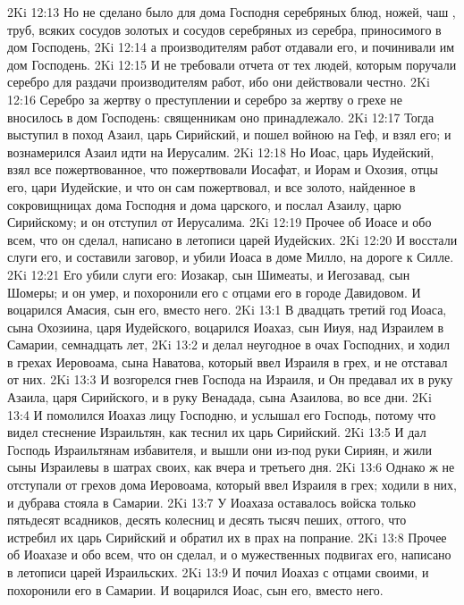 \vs 2Ki 12:13 Но не сделано было для дома Господня серебряных блюд, ножей, чаш , труб, всяких сосудов золотых и сосудов серебряных из серебра, приносимого в дом Господень,
\vs 2Ki 12:14 а производителям работ отдавали его, и починивали им дом Господень.
\vs 2Ki 12:15 И не требовали отчета от тех людей, которым поручали серебро для раздачи производителям работ, ибо они действовали честно.
\vs 2Ki 12:16 Серебро за жертву о преступлении и серебро за жертву о грехе не вносилось в дом Господень: священникам оно принадлежало.
\rsbpar\vs 2Ki 12:17 Тогда выступил в поход Азаил, царь Сирийский, и пошел войною на Геф, и взял его; и вознамерился Азаил идти на Иерусалим.
\vs 2Ki 12:18 Но Иоас, царь Иудейский, взял все пожертвованное, что пожертвовали  Иосафат, и Иорам и Охозия, отцы его, цари Иудейские, и что он сам пожертвовал, и все золото, найденное в сокровищницах дома Господня и дома царского, и послал Азаилу, царю Сирийскому; и он отступил от Иерусалима.
\rsbpar\vs 2Ki 12:19 Прочее об Иоасе и обо всем, что он сделал, написано в летописи царей Иудейских.
\rsbpar\vs 2Ki 12:20 И восстали слуги его, и составили заговор, и убили Иоаса в доме Милло, на дороге к Силле.
\vs 2Ki 12:21 Его убили слуги его: Иозакар, сын Шимеаты, и Иегозавад, сын Шомеры; и он умер, и похоронили его с отцами его в городе Давидовом. И воцарился Амасия, сын его, вместо него.
\vs 2Ki 13:1 В двадцать третий год Иоаса, сына Охозиина, царя Иудейского, воцарился Иоахаз, сын Ииуя, над Израилем в Самарии,  семнадцать лет,
\vs 2Ki 13:2 и делал неугодное в очах Господних, и ходил в грехах Иеровоама, сына Наватова, который ввел Израиля в грех, и не отставал от них.
\vs 2Ki 13:3 И возгорелся гнев Господа на Израиля, и Он предавал их в руку Азаила, царя Сирийского, и в руку Венадада, сына Азаилова, во все дни.
\vs 2Ki 13:4 И помолился Иоахаз лицу Господню, и услышал его Господь, потому что видел стеснение Израильтян, как теснил их царь Сирийский.
\vs 2Ki 13:5 И дал Господь Израильтянам избавителя, и вышли они из-под руки Сириян, и жили сыны Израилевы в шатрах своих, как вчера и третьего дня.
\vs 2Ki 13:6 Однако ж не отступали от грехов дома Иеровоама, который ввел Израиля в грех; ходили в них, и дубрава стояла в Самарии.
\vs 2Ki 13:7 У Иоахаза оставалось войска только пятьдесят всадников, десять колесниц и десять тысяч пеших, оттого, что истребил их царь Сирийский и обратил их в прах на попрание.
\rsbpar\vs 2Ki 13:8 Прочее об Иоахазе и обо всем, что он сделал, и о мужественных подвигах его, написано в летописи царей Израильских.
\vs 2Ki 13:9 И почил Иоахаз с отцами своими, и похоронили его в Самарии. И воцарился Иоас, сын его, вместо него.
